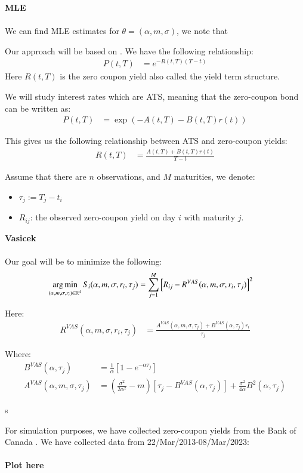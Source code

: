 \newpage 
\textbf{MLE}
\\~\\ 
We can find MLE  estimates for $\theta = (\alpha, m, \sigma)$, we note that 








\newpage 
Our approach will be based on \cite{halga2014}. We have the following relationship: 
\begin{align*}
P(t,T) &= e^{-R(t,T)(T-t)}
\end{align*}
Here $R(t,T)$ is the zero coupon yield also called the yield term structure. 


We will study interest rates which are ATS, meaning that the zero-coupon bond can be written as:
\begin{align*}
P(t,T) &= 
\exp\left(
-A(t,T) -B(t,T)r(t)
\right)
\end{align*}

This gives us the following relationship between ATS and zero-coupon yields: 
\begin{align*}
R(t,T) &= \frac{
A(t,T) + B(t,T)r(t)
}{
T-t
}    
\end{align*}

Assume that there are $n$ observations, and $M$ maturities, we denote: 
\begin{itemize}
    \item $\tau_{j} := T_{j} - t_{i}$
    \item $R_{ij}$: the observed zero-coupon yield on day $i$ with maturity $j$. 
\end{itemize}

\textbf{Vasicek}
\\~\\
Our goal will be to minimize the following: 
\begin{align*}
\operatorname*{arg\,min}\limits_{(\alpha, m, \sigma, r_{i}) \in \mathbb{R}^{4}}
S_{i}(\alpha, m, \sigma, r_{i}, \tau_{j}) 
&= 
\sum_{j=1}^{M}\left[
R_{ij} - R^{VAS}(\alpha, m, \sigma, r_{i}, \tau_{j})
\right]^{2}
\end{align*}

Here: 
\begin{align*}
R^{VAS}(\alpha, m, \sigma, r_{i}, \tau_{j})
&= 
\frac{
A^{VAS}(\alpha, m, \sigma, \tau_{j}) + B^{VAS}(\alpha, \tau_{j})r_{i}
}{
\tau_{j}
} 
\end{align*}

Where: 
\begin{align*}
B^{VAS}(\alpha, \tau_{j}) &= \frac{1}{\alpha}\left[
1 - e^{-\alpha \tau_{j}}
\right] \\ 
A^{VAS}(\alpha, m, \sigma, \tau_{j})
&= 
\left(
\frac{\sigma^{2}}{2\alpha^{2}} - m
\right)\left[
\tau_{j} - B^{VAS}(\alpha, \tau_{j})
\right]
+ \frac{\sigma^{2}}{4\alpha}B^{2}(\alpha, \tau_{j})
\end{align*}

\newpage 

s



\newpage 
For simulation purposes, we have collected zero-coupon yields from the Bank of Canada \cite{Canada_termyields}. We have collected data from 22/Mar/2013-08/Mar/2023: 
\\~\\ 
\textbf{Plot here}
\\~\\



